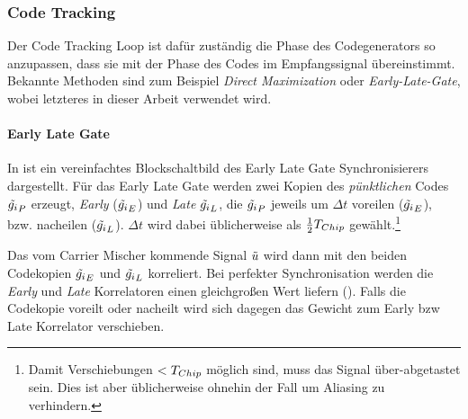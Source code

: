 
\subsubsection{Code Tracking}
Der Code Tracking Loop ist dafür zuständig die Phase des Codegenerators so anzupassen, dass sie mit der Phase des Codes im Empfangssignal übereinstimmt. Bekannte Methoden sind zum Beispiel \emph{Direct Maximization} oder \emph{Early-Late-Gate}, wobei letzteres in dieser Arbeit verwendet wird. 


\paragraph{Early Late Gate} \label{EarlyLateGate} In  ist ein vereinfachtes Blockschaltbild des Early Late Gate Synchronisierers dargestellt. Für das Early Late Gate werden zwei Kopien des \emph{pünktlichen} Codes $\tilde{g_i}_P$ erzeugt, \emph{Early} ($\tilde{g_i}_E$) und \emph{Late} $\tilde{g_i}_L$, die $\tilde{g_i}_P$ jeweils  um $\Delta t$ voreilen ($\tilde{g_i}_E$), bzw. nacheilen ($\tilde{g_i}_L$). $\Delta t$ wird dabei üblicherweise als $\frac{1}{2} {T}_{Chip}$ gewählt.\footnote{Damit Verschiebungen $<{T}_{Chip}$ möglich sind, muss das Signal über-abgetastet sein. Dies ist aber üblicherweise ohnehin der Fall um Aliasing zu verhindern.}

Das vom Carrier Mischer kommende Signal $\tilde{u}$ wird dann mit den beiden Codekopien $\tilde{g_i}_E$ und $\tilde{g_i}_L$ korreliert. Bei perfekter Synchronisation werden die \emph{Early} und \emph{Late} Korrelatoren einen gleichgroßen Wert liefern (). Falls die Codekopie voreilt oder nacheilt wird sich dagegen das Gewicht zum Early bzw Late Korrelator verschieben. 

\newcommand{\markerEarly}{\tikz{ \filldraw[fill=bmh02, draw=black, thin] (0,0) circle (.8ex); }~}
\newcommand{\markerLate}{\tikz{ \filldraw[fill=bmh04, draw=black, thin] (0,0) rectangle (1.4ex,1.4ex); }~}

